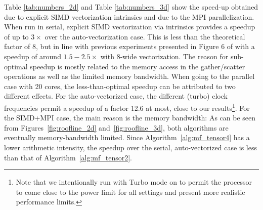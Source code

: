 \documentclass[AMA,STIX1COL]{WileyNJD-v2}
\begin{document}
\begin{table}
  \caption{Wall-clock time in seconds and performance in GFlops of Algorithms~\ref{alg:mf_tensor2} and \ref{alg:mf_tensor4} in 3D for various combinations of polynomial degrees,
  vectorization and parallelization on Cascade Lake.}
  \centering
  \label{tab:numbers_3d}
\end{table}

Table \ref{tab:numbers_2d} and Table \ref{tab:numbers_3d} show the speed-up obtained due to explicit SIMD vectorization intrinsics and due to the MPI parallelization.
When run in serial, explicit SIMD vectorization via intrinsics provides a speedup of up to $3\times$ over the auto-vectorization case.
This is less than the theoretical factor of 8, but in line with previous experiments presented in Figure 6 of \cite{kronbichler2017fastcomputer} with a speedup of around $1.5-2.5\times$ with 8-wide vectorization.
The reason for sub-optimal speedup is mostly related to the memory access in the gather/scatter operations as well as the limited memory bandwidth. When going to the parallel case with 20 cores, the less-than-optimal speedup can be attributed to two different effects.
For the auto-vectorized case, the different (turbo) clock frequencies permit a speedup of a factor 12.6 at most, close to our
results\footnote{Note that we intentionally run with Turbo mode on to permit the processor to come close to the power limit for all settings and present more realistic performance limits.}.
For the SIMD+MPI case, the main reason is the memory bandwidth: As can be seen from Figures~\ref{fig:roofline_2d} and~\ref{fig:roofline_3d},
both algorithms are eventually memory-bandwidth limited. Since Algorithm~\ref{alg:mf_tensor4} has a lower arithmetic intensity,
the speedup over the serial, auto-vectorized case is less than that of Algorithm~\ref{alg:mf_tensor2}.
\end{document}
